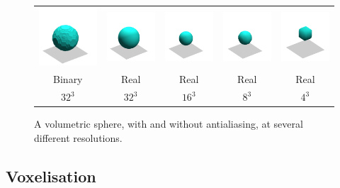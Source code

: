 \begin{figure}
  \begin{tabular}{ccccc}
    \includegraphics[width=0.18\linewidth]{chapter_background/img/binary_32x32x32.png} &
    \includegraphics[width=0.18\linewidth]{chapter_background/img/real_32x32x32.png} &
    \includegraphics[width=0.18\linewidth]{chapter_background/img/real_16x16x16.png} &
    \includegraphics[width=0.18\linewidth]{chapter_background/img/real_8x8x8.png} &
    \includegraphics[width=0.18\linewidth]{chapter_background/img/real_4x4x4.png}
    \\
    Binary & Real & Real & Real & Real \\
    $32^3$ & $32^3$ & $16^3$ & $8^3$ & $4^3$ \\
  \end{tabular}
  \caption[Volumetric antialiasing at different resolutions]{A
    volumetric sphere, with and without antialiasing, at several
    different resolutions.}
  \label{fig:background:volquality}
\end{figure}

\subsection{Voxelisation}

